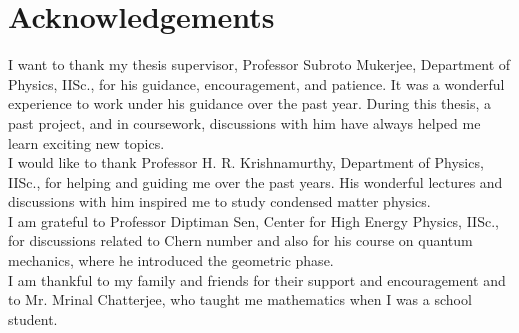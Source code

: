 \documentclass{report}
\begin{document}
\maketitle



%


\chapter*{\center Acknowledgements}%
%
I want to thank my thesis supervisor, Professor Subroto Mukerjee, Department of Physics, IISc., for his guidance, encouragement, and patience. It was a wonderful experience to work under his guidance over the past year. During this thesis, a past project, and in coursework, discussions with him have always helped me learn exciting new topics. \\

I would like to thank Professor H. R. Krishnamurthy, Department of Physics, IISc., for helping and guiding me over the past years. His wonderful lectures and discussions with him inspired me to study condensed matter physics.\\

I am grateful to Professor Diptiman Sen, Center for High Energy Physics, IISc., for discussions related to Chern number and also for his course on quantum mechanics, where he introduced the geometric phase.\\

I am thankful to my family and friends for their support and encouragement and to Mr. Mrinal Chatterjee, who taught me mathematics when I was a school student.
\end{document}
